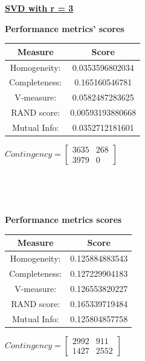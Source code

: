 \documentclass{report}
\begin{document}
\underline{\textbf{SVD with r = 3}} \\

\begin{center}
	\textbf{Performance metrics' scores} \\ \vspace{10pt}	
	\begin{tabular}{*{2}{c}}	
		\toprule
		\textbf{Measure} & \textbf{Score} \\ 
		\midrule
		Homogeneity: & 0.0353596802034 \\
		\midrule 
		Completeness: & 0.165160546781 \\
		\midule
		V-measure: 	& 0.0582487283625 \\
		\midrule
		RAND score: & 0.00593193880668 \\
		\midrule
		Mutual Info: & 0.0352712181601 \\
		\bottomrule
	\end{tabular}
	\qquad
	$Contingency = \left[ \begin{array}{*{2}{c}}
		3635 & 268 \\
		3979 & 0   
        \end{array}\right]
		$
\end{center}
\\  \vspace{20pt}

 \\
\begin{center}
	\textbf{Performance metrics scores} \\ \vspace{10pt}	
	\begin{tabular}{*{2}{c}}
		\toprule
		\textbf{Measure} & \textbf{Score} \\
		\midrule		
		Homogeneity: & 0.125884883543 \\
		\midrule
		Completeness: & 0.127229904183 \\
		\midrule
		V-measure: & 0.126553820227 \\
		\midrule
		RAND score: & 0.165339719484 \\
		\midrule
		Mutual Info: & 0.125804857758 \\
		\bottomrule
	\end{tabular}
	\qquad
	$Contingency = \left[ \begin{array}{*{2}{c}}
		2992  & 911 \\
		1427  & 2552 
		\end{array}\right]
		$
\end{center}
\\
\end{document}
